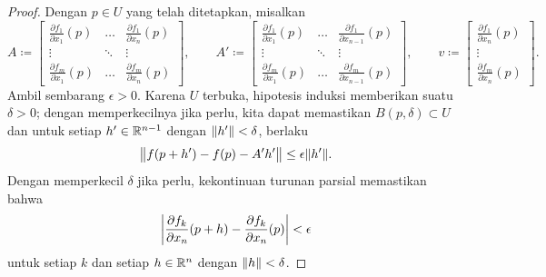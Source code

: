 \begin{proof}
Dengan $p \in U$ yang telah ditetapkan, misalkan
\begin{equation*}
A \coloneqq 
\begin{bmatrix}
\frac{\partial f_1}{\partial x_1}(p)
& \ldots &
\frac{\partial f_1}{\partial x_n}(p)
\\
\vdots & \ddots & \vdots
\\
\frac{\partial f_m}{\partial x_1}(p)
& \ldots &
\frac{\partial f_m}{\partial x_n}(p)
\end{bmatrix} ,
\qquad
A' \coloneqq 
\begin{bmatrix}
\frac{\partial f_1}{\partial x_1}(p)
& \ldots &
\frac{\partial f_1}{\partial x_{n-1}}(p)
\\
\vdots & \ddots & \vdots
\\
\frac{\partial f_m}{\partial x_1}(p)
& \ldots &
\frac{\partial f_m}{\partial x_{n-1}}(p)
\end{bmatrix} ,
\qquad
v \coloneqq 
\begin{bmatrix}
\frac{\partial f_1}{\partial x_n}(p)
\\
\vdots
\\
\frac{\partial f_m}{\partial x_n}(p)
\end{bmatrix} .
\end{equation*}
Ambil sembarang $\epsilon > 0$.  Karena $U$ terbuka, hipotesis induksi memberikan
suatu $\delta > 0$; dengan memperkecilnya jika perlu, kita dapat memastikan $B(p,\delta) \subset U$ dan
untuk setiap $h' \in {\mathbb{R}}^{n-1}$ dengan $\lVert {h'} \rVert < \delta$, berlaku
\begin{equation*}
\bigl\lVert {f(p+h') - f(p) - A' h'} \bigr\rVert \leq \epsilon \lVert {h'} \rVert .
\end{equation*}
Dengan memperkecil $\delta$ jika perlu, kekontinuan turunan parsial memastikan
bahwa
\begin{equation*}
\left\lvert {\frac{\partial f_k}{\partial x_n}(p+h)
      - \frac{\partial f_k}{\partial x_n}(p)} \right\rvert < \epsilon
\end{equation*}
untuk setiap $k$ dan setiap $h \in {\mathbb{R}}^n$ dengan $\lVert {h} \rVert < \delta$.


\end{proof}
